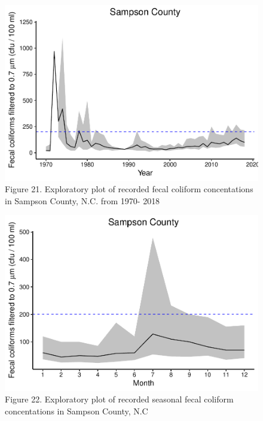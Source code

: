 \documentclass[12pt,]{article}
\begin{document}
\begin{figure}
\centering
\includegraphics{Edmondson_ENV872_Project_files/figure-latex/unnamed-chunk-20-1.pdf}
\caption{Figure 21. Exploratory plot of recorded fecal coliform
concentations in Sampson County, N.C. from 1970- 2018}
\end{figure}

\begin{figure}
\centering
\includegraphics{Edmondson_ENV872_Project_files/figure-latex/unnamed-chunk-21-1.pdf}
\caption{Figure 22. Exploratory plot of recorded seasonal fecal coliform
concentations in Sampson County, N.C}
\end{figure}
\end{document}
